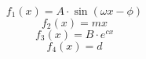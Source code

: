 \documentclass{article}
\begin{document}
\begin{equation}
f_1(x) = A \cdot \sin(\omega x - \phi)
\end{equation}
\begin{equation}
f_2(x) = m x
\end{equation}
\begin{equation}
f_3(x) = B \cdot e^{cx}
\end{equation}
\begin{equation}
f_4(x) = d
\end{equation}
\end{document}
